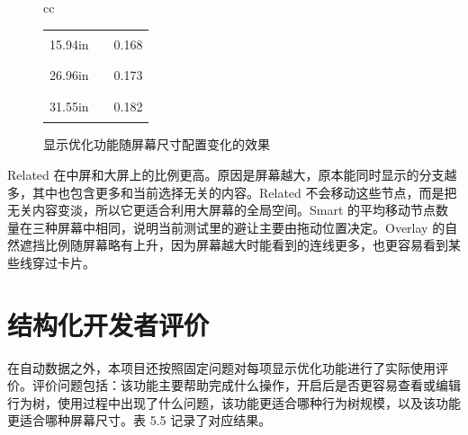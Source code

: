 \documentclass[11pt,a4paper,oneside,extrafontsizes]{memoir}
\begin{document}
\begin{center}
\begin{figure}[htbp]
\begin{tabular}{cc}
\begin{minipage}[t]{0.46\textwidth}
\begin{tabular}{@{}r l r@{}}
15.94in & \textcolor{blue!70!black}{\rule{0.1843\textwidth}{1.1ex}} & 0.168 \\
26.96in & \textcolor{blue!70!black}{\rule{0.1901\textwidth}{1.1ex}} & 0.173 \\
31.55in & \textcolor{blue!70!black}{\rule{0.2000\textwidth}{1.1ex}} & 0.182 \\
\end{tabular}
\end{minipage}
\end{tabular}
\caption{显示优化功能随屏幕尺寸配置变化的效果}
\label{fig:display-screen-metrics}
\end{figure}

\end{center}

Related 在中屏和大屏上的比例更高。原因是屏幕越大，原本能同时显示的分支越多，其中也包含更多和当前选择无关的内容。Related 不会移动这些节点，而是把无关内容变淡，所以它更适合利用大屏幕的全局空间。Smart 的平均移动节点数量在三种屏幕中相同，说明当前测试里的避让主要由拖动位置决定。Overlay 的自然遮挡比例随屏幕略有上升，因为屏幕越大时能看到的连线更多，也更容易看到某些线穿过卡片。

\section{结构化开发者评价}

在自动数据之外，本项目还按照固定问题对每项显示优化功能进行了实际使用评价。评价问题包括：该功能主要帮助完成什么操作，开启后是否更容易查看或编辑行为树，使用过程中出现了什么问题，该功能更适合哪种行为树规模，以及该功能更适合哪种屏幕尺寸。表 5.5 记录了对应结果。
\end{document}
